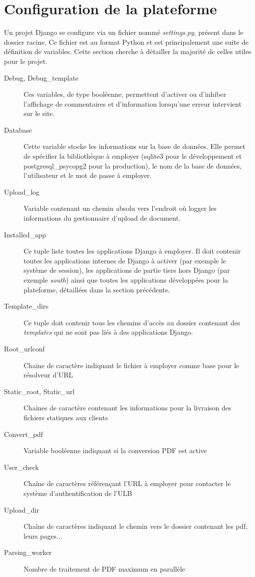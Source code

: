 \documentclass[a4paper,12pt]{article}
\begin{document}
\section{Configuration de la plateforme}

Un projet Django se configure via un fichier nommé \textit{settings.py},
présent dans le dossier racine. Ce fichier est au format Python et est principalement
une suite de définition de variables. Cette section cherche à détailler la majorité
de celles utiles pour le projet.

\begin{description}
\item[Debug, Debug\_template] Ces variables, de type booléenne, permettent d'activer
      ou d'inhiber l'affichage de commentaires et d'information lorsqu'une erreur
      intervient sur le site.
\item[Database] Cette variable stocke les informations sur la base de données. Elle
      permet de spécifier la bibliothèque à employer (sqlite3 pour le développement
      et postgresql\_psycopg2 pour la production), le nom de la base de données, l'utilisateur
      et le mot de passe à employer.
\item[Upload\_log] Variable contenant un chemin absolu vers l'endroit où logger
      les informations du gestionnaire d'upload de document.
\item[Installed\_app] Ce tuple liste toutes les applications Django à employer. Il
      doit contenir toutes les applications internes de Django à activer (par exemple
      le système de session), les applications de partie tiers hors Django (par exemple
      \textit{south}) ainsi que toutes les applications développées pour la plateforme,
      détaillées dans la section précédente.
\item[Template\_dirs] Ce tuple doit contenir tous les chemins d'accès au dossier
      contenant des \textit{templates} qui ne sont pas liés à des applications Django.
\item[Root\_urlconf] Chaine de caractère indiquant le fichier à employer comme
      base pour le résolveur d'URL
\item[Static\_root, Static\_url] Chaines de caractère contenant les informations
      pour la livraison des fichiers statiques aux clients
\item[Convert\_pdf] Variable booléenne indiquant si la conversion PDF est active
\item[User\_check] Chaîne de caractères référençant l'URL à employer pour contacter
      le système d'authentification de l'ULB
\item[Upload\_dir] Chaîne de caractères indiquant le chemin vers le dossier contenant
      les pdf, leurs pages...
\item[Parsing\_worker] Nombre de traitement de PDF maximum en parallèle
\end{description}
\end{document}

